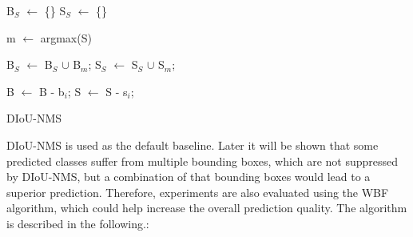 \begin{algorithm}[H]

\SetAlgoLined
{}


B$_S$ $\gets$ \{\}\;
S$_S$ $\gets$ \{\}\;

 {
    m $\gets$ argmax(S)

    B$_S$ $\gets$ B$_S$ $\cup$ B$_m$;
    S$_S$ $\gets$ S$_S$ $\cup$ S$_m$;

     {
         {
            B $\gets$ B - b$_i$;
            S $\gets$ S - s$_i$;
        }
    }

}

\caption{\ac{DIoU}-\ac{NMS}}\label{alg:diou_nms}
\end{algorithm}

DIoU-NMS is used as the default baseline. Later it will be shown that some predicted classes suffer from multiple bounding boxes, which are not suppressed by DIoU-NMS, but a combination of that bounding boxes would lead to a superior prediction.
Therefore, experiments are also evaluated using the \ac{WBF} \cite{weighted_bbox_fusion} algorithm, which could help increase the overall prediction quality. The algorithm is described in the following.:

